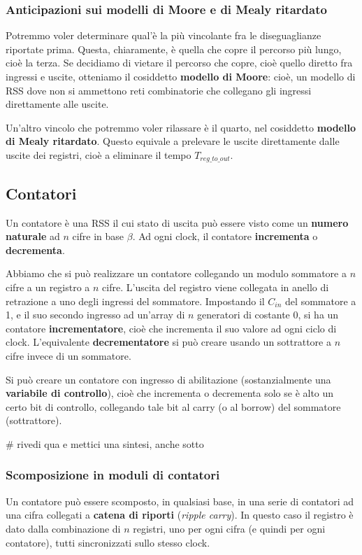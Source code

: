 \documentclass[a4paper,11pt]{article}
\begin{document}
\subsubsection{Anticipazioni sui modelli di Moore e di Mealy ritardato}
Potremmo voler determinare qual'è la più vincolante fra le diseguaglianze riportate prima.
Questa, chiaramente, è quella che copre il percorso più lungo, cioè la terza.
Se decidiamo di vietare il percorso che copre, cioè quello diretto fra ingressi e uscite, otteniamo il cosiddetto \textbf{modello di Moore}: cioè, un modello di RSS dove non si ammettono reti combinatorie che collegano gli ingressi direttamente alle uscite.

Un'altro vincolo che potremmo voler rilassare è il quarto, nel cosiddetto \textbf{modello di Mealy ritardato}.
Questo equivale a prelevare le uscite direttamente dalle uscite dei registri, cioè a eliminare il tempo $T_{reg\_to\_out}$.

\subsection{Contatori}
Un contatore è una RSS il cui stato di uscita può essere visto come un \textbf{numero naturale} ad $n$ cifre in base $\beta$.
Ad ogni clock, il contatore \textbf{incrementa} o \textbf{decrementa}.

Abbiamo che si può realizzare un contatore collegando un modulo sommatore a $n$ cifre a un registro a $n$ cifre.
L'uscita del registro viene collegata in anello di retrazione a uno degli ingressi del sommatore.
Impostando il $C_{in}$ del sommatore a 1, e il suo secondo ingresso ad un'array di $n$ generatori di costante 0, si ha un contatore \textbf{incrementatore}, cioè che incrementa il suo valore ad ogni ciclo di clock.
L'equivalente \textbf{decrementatore} si può creare usando un sottrattore a $n$ cifre invece di un sommatore.

Si può creare un contatore con ingresso di abilitazione (sostanzialmente una \textbf{variabile di controllo}), cioè che incrementa o decrementa solo se è alto un certo bit di controllo, collegando tale bit al carry (o al borrow) del sommatore (sottrattore).

# rivedi qua e mettici una sintesi, anche sotto

\subsubsection{Scomposizione in moduli di contatori}
Un contatore può essere scomposto, in qualsiasi base, in una serie di contatori ad una cifra collegati a \textbf{catena di riporti} (\textit{ripple carry}).
In questo caso il registro è dato dalla combinazione di $n$ registri, uno per ogni cifra (e quindi per ogni contatore), tutti sincronizzati sullo stesso clock.
\end{document}
